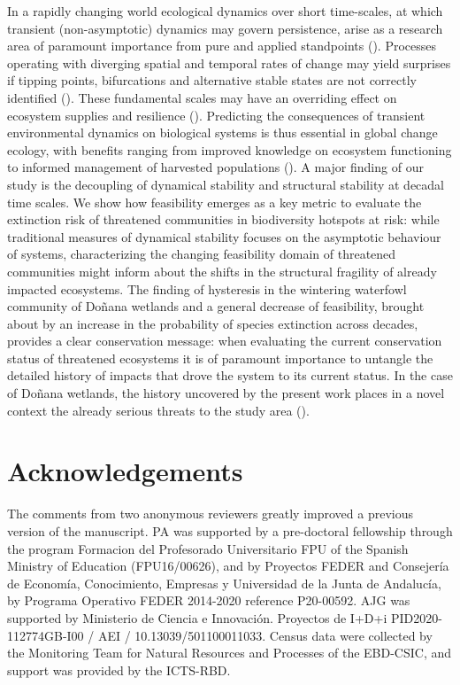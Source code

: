 \documentclass[12pt]{article}
\begin{document}
In a rapidly changing world ecological dynamics over short time-scales, at which transient (non-asymptotic) dynamics may govern persistence, arise as a research area of paramount importance from pure and applied standpoints (\cite{Hastings2018}). Processes operating with diverging spatial and temporal rates of change may yield surprises if tipping points, bifurcations and alternative stable states are not correctly identified (\cite{Watts2020,Williams2021a,Scheffer2009a}). These fundamental scales may have an overriding effect on ecosystem supplies and resilience (\cite{Folke2004b,Scheffer2009a}). Predicting the consequences of transient environmental dynamics on biological systems is thus essential in global change ecology, with benefits ranging from improved knowledge on ecosystem functioning to informed management of harvested populations (\cite{Suding2004a,Scheffer2009a,Francis2021}). A major finding of our study is the decoupling of dynamical stability and structural stability at decadal time scales. We show how feasibility emerges as a key metric to evaluate the extinction risk of threatened communities in biodiversity hotspots at risk: while traditional measures of dynamical stability focuses on the asymptotic behaviour of systems, characterizing the changing feasibility domain of threatened communities might inform about the shifts in the structural fragility of already impacted ecosystems. The finding of hysteresis in the wintering waterfowl community of Doñana wetlands and a general decrease of feasibility, brought about by an increase in the probability of species extinction across decades, provides a clear conservation message: when evaluating the current conservation status of threatened ecosystems it is of paramount importance to untangle the detailed history of impacts that drove the system to its current status. In the case of Doñana wetlands, the history uncovered by the present work places in a novel context the already serious threats to the study area (\cite{Scheffer2015a,Camacho2022,Green2024,Santamaria2023}). \\

\section*{Acknowledgements}
The comments from two anonymous reviewers greatly improved a previous version of the manuscript. PA was supported by a pre-doctoral fellowship through the program Formacion del Profesorado Universitario FPU of the Spanish Ministry of Education (FPU16/00626), and by Proyectos FEDER and Consejería de Economía, Conocimiento, Empresas y Universidad de la Junta de Andalucía, by Programa Operativo FEDER 2014-2020 reference P20-00592. AJG was supported by Ministerio de Ciencia e Innovación. Proyectos de I+D+i PID2020-112774GB-I00 / AEI / 10.13039/501100011033. Census data were collected by the Monitoring Team for Natural Resources and Processes of the EBD-CSIC, and support was provided by the ICTS-RBD.\\
\end{document}
